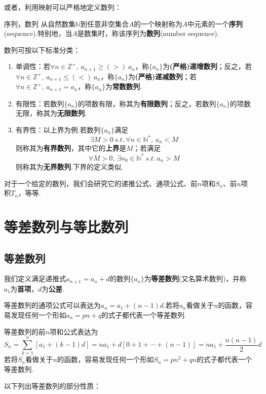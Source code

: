 \documentclass[lang=cn, zihao=5]{elegantbook}
\begin{document}
或者，利用映射可以严格地定义数列：

\begin{definition}{序列，数列}
	从自然数集$\mathbb{N}$到任意非空集合$A$的一个映射称为$A$中元素的一个\textbf{序列}(sequence).特别地，当$A$是数集时，称该序列为\textbf{数列}(number sequence).
\end{definition}

数列可按以下标准分类：
\begin{enumerate}
	\item 单调性：若$\forall n \in \mathbb{Z}^+,~ a_{n+1} \geq (>)~ a_n$，称$\{ a_n \}$为\textbf{(严格)递增数列}；反之，若$\forall n \in \mathbb{Z}^+,~ a_{n+1} \leq (<)~ a_n$，称$\{ a_n \}$为\textbf{(严格)递减数列}；若$\forall n \in \mathbb{Z}^+,~ a_{n+1} = a_n$，称$\{ a_n \}$为\textbf{常数数列}.
	\item 有限性：若数列$\{ a_n \}$的项数有限，称其为\textbf{有限数列}；反之，若数列$\{ a_n \}$的项数无限，称其为\textbf{无限数列}.
	\item 有界性：以上界为例.若数列$\{ a_n \}$满足
	$$\exists M > 0 ~s.t.~ \forall n \in \mathbb{N}^{*},~ a_n<M$$
	则称其为\textbf{有界数列}，其中它的\textbf{上界}是$M$；若满足
	$$\forall M > 0 ,~ \exists n_0 \in \mathbb{N}^{*} ~s.t.~ a_n>M$$
	则称其为\textbf{无界数列}.下界的定义类似.
\end{enumerate}

对于一个给定的数列，我们会研究它的递推公式、通项公式、前$n$项和$S_n$、前$n$项积$T_n$，等等.

\section{等差数列与等比数列}

\subsection{等差数列}

我们定义满足递推式$a_{n+1}=a_n+d$的数列$\{ a_n \}$为\textbf{等差数列}(又名算术数列)，并称$a_1$为\textbf{首项}，$d$为\textbf{公差}.

等差数列的通项公式可以表达为$a_n=a_1+(n-1)d$.若将$a_n$看做关于$n$的函数，容易发现任何一个形如$a_n=pn+q$的式子都代表一个等差数列.

等差数列的前$n$项和公式表达为$$S_n = \sum _{k=1}^{n} [a_1+(k-1)d] = na_1 + d[0+ 1 + \cdots +(n-1)] = na_1 + \frac{n(n-1)}{2}d$$
若将$S_n$看做关于$n$的函数，容易发现任何一个形如$S_n=pn^2+qn$的式子都代表一个等差数列.

以下列出等差数列的部分性质：
\end{document}
